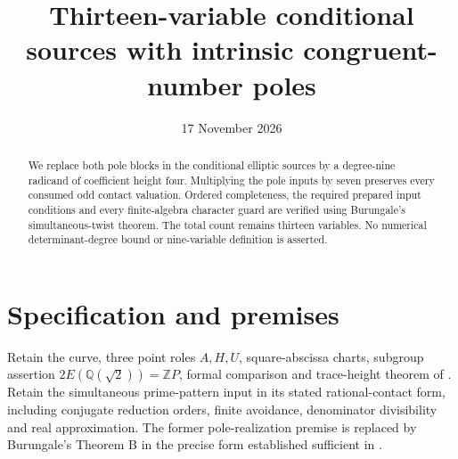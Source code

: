 \documentclass[11pt,a4paper]{article}
\title{Thirteen-variable conditional sources with intrinsic congruent-number poles}
\author{}\date{17 November 2026}
\newcommand{\Q}{\mathbb Q}\newcommand{\Z}{\mathbb Z}
\begin{document}
\maketitle
\begin{abstract}
We replace both pole blocks in the conditional elliptic sources by a
degree-nine radicand of coefficient height four. Multiplying the
pole inputs by seven preserves every consumed odd contact valuation. Ordered
completeness, the required prepared input conditions and every
finite-algebra character guard are verified using Burungale's
simultaneous-twist theorem. The total count remains thirteen variables.
No numerical determinant-degree bound or nine-variable definition is asserted.
\end{abstract}

\section{Specification and premises}
Retain the curve, three point roles $A,H,U$, square-abscissa charts,
subgroup assertion $2E(\Q(\sqrt2))=\Z P$, formal comparison and
trace-height theorem of \cite{Conditional,Reweighted,Unit}. Retain the
simultaneous prime-pattern input in its stated rational-contact form,
including conjugate reduction orders, finite avoidance, denominator
divisibility and real approximation. The former pole-realization
premise is replaced by Burungale's Theorem B in the precise form
established sufficient in \cite{Intrinsic}.
\end{document}
